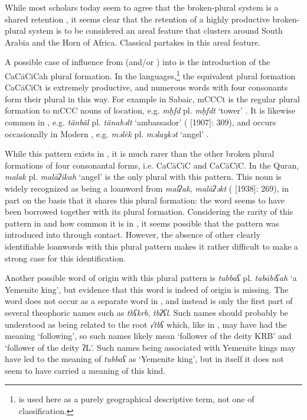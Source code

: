 \documentclass[output=paper]{langsci/langscibook}
\begin{document}
While most scholars today seem to agree that the broken-plural system is a shared retention \citep[1116]{Weninger2011GenEth}, it seems clear that the retention of a highly productive broken-plural system is to be considered an areal feature that clusters around South Arabia and the Horn of Africa. Classical  partakes in this areal feature.

A possible case of influence from  (and/or ) into  is the introduction of the CaCāCiCah plural {formation}. In the  languages,\footnote{ is used here as a purely geographical descriptive term, not one of classification.} the equivalent plural {formation} CaCāCiCt is extremely productive, and numerous words with four consonants form their plural in this way. For example in Sabaic, mCCCt is the regular plural {formation} to mCCC nouns  of location, e.g. \textit{mḥfd} pl. \textit{mḥfdt} ‘tower’ \citep[34]{Beeston1962}. It is likewise common in , e.g. \textit{tänbäl} pl. \textit{tänabəlt} ‘ambassador’ (\citealt{Dillmann2005} [1907]: 309), and occurs occasionally in Modern , e.g.  \textit{məlēk} pl. \textit{məlaykət} ‘angel’ \citep[68]{Rubin2010}.

While this pattern exists in , it is much rarer than the other {broken plural} formations of four consonantal forms, i.e. CaCāCiC and CaCāCīC. In the {Quran}, \textit{malak} pl. \textit{malāʔikah} ‘angel’ is the only plural with this pattern. This noun is widely recognized as being a {loanword} from  \textit{malʔak,} \textit{malāʔəkt} (\citealt{Jeffrey2007} [1938]: 269), in part on the basis that it shares this plural {formation}: the word seems to have been borrowed together with its plural {formation}. Considering the rarity of this pattern in  and how common it is in , it seems possible that the pattern was introduced into  through  contact. However, the absence of other clearly identifiable  {loanwords} with this plural pattern makes it rather difficult to make a strong case for this identification.

Another possible word of  origin with this plural pattern is \textit{tubbaʕ} pl. \textit{tabābiʕah} ‘a Yemenite king’, but evidence that this word is indeed of  origin is missing. The word does not occur as a separate word in , and instead is only the first part of several  theophoric names such as \textit{tbʕkrb}, \textit{tbʔʕl}. Such names should probably be understood as being related to the {root} \textit{√tbʕ} which, like in , may have had the meaning ‘following’, so such names likely mean ‘follower of the deity KRB’ and ‘follower of the deity ʔL’. Such names being associated with Yemenite kings may have led to the  meaning of \textit{tubbaʕ} as ‘Yemenite king’, but in  itself it does not seem to have carried a meaning of this kind. 
\end{document}
